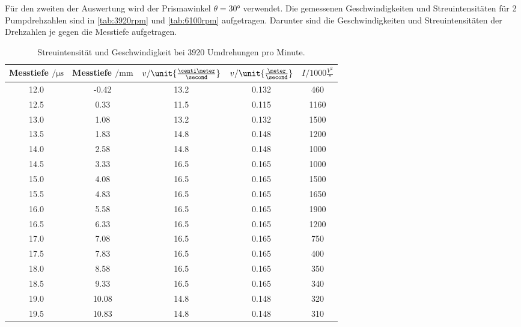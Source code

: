 Für den zweiten der Auswertung wird der Prismawinkel $\theta =30°$ verwendet. Die gemessenen Geschwindigkeiten und Streuintensitäten für 2 Pumpdrehzahlen sind in \autoref{tab:3920rpm} und \autoref{tab:6100rpm} aufgetragen.
Darunter sind die Geschwindigkeiten und Streuintensitäten der Drehzahlen je gegen die Messtiefe aufgetragen.
 \begin{table}
     \centering
     \caption{Streuintensität und Geschwindigkeit bei 3920 Umdrehungen pro Minute.}
     \begin{tabular}{c c c c c}
         \toprule
         Messtiefe $ \mathrm{/} \unit{\micro \second}$ &  Messtiefe $ \mathrm{/} \unit{\milli \meter}$ & $v \mathrm{/} \unit{\frac{\centi \meter}{\second}}$ & $v \mathrm{/} \unit{\frac{\meter}{\second}}$ & $I \mathrm{/} 1000\unit{\frac{V^2}{\second}}$\\
         \midrule
         12.0 &  -0.42 &  13.2 &  0.132 &  460\\
         12.5 &  0.33 &  11.5 &  0.115 &  1160\\
         13.0 &  1.08 &  13.2 &  0.132 &  1500\\
         13.5 &  1.83 &  14.8 &  0.148 &  1200\\
         14.0 &  2.58 &  14.8 &  0.148 &  1000\\
         14.5 &  3.33 &  16.5 &  0.165 &  1000\\
         15.0 &  4.08 &  16.5 &  0.165 &  1500\\
         15.5 &  4.83 &  16.5 &  0.165 &  1650\\
         16.0 &  5.58 &  16.5 &  0.165 &  1900\\
         16.5 &  6.33 &  16.5 &  0.165 &  1200\\
         17.0 &  7.08 &  16.5 &  0.165 &  750\\
         17.5 &  7.83 &  16.5 &  0.165 &  400\\
         18.0 &  8.58 &  16.5 &  0.165 &  350\\
         18.5 &  9.33 &  16.5 &  0.165 &  340\\
         19.0 &  10.08 &  14.8 &  0.148 &  320\\
         19.5 &  10.83 &  14.8 &  0.148 &  310\\
         \bottomrule
     \end{tabular}
     \label{tab:3920rpm}
\end{table}
